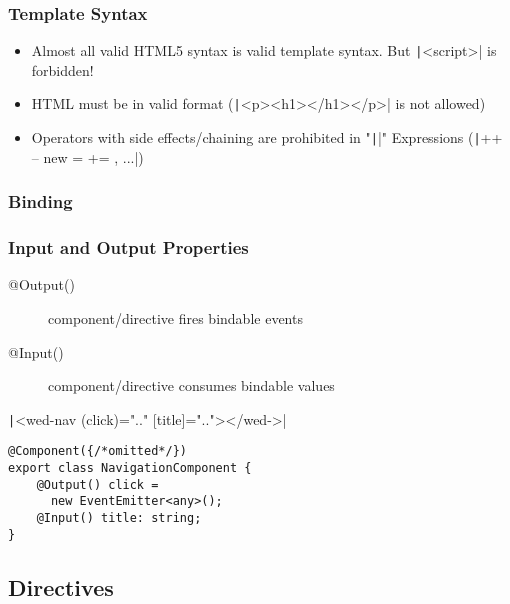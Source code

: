 \begin{multicols*}{4}
\subsubsection{Template Syntax}
\begin{itemize}
    \item Almost all valid HTML5 syntax is valid template syntax. But \texttt|<script>| is forbidden!
    \item HTML must be in valid format (\texttt|<p><h1></h1></p>| is not allowed)
    \item Operators with side effects/chaining are prohibited in "\texttt|{{}}|" Expressions (\texttt|++ -- new = += , ...|)
\end{itemize}

\subsubsection{Binding}

\subsubsection{Input and Output Properties}
\begin{description}
    \item[@Output()] component/directive fires bindable events
    \item[@Input()] component/directive consumes bindable values
\end{description}
\texttt|<wed-nav (click)=".." [title]=".."></wed->|
\begin{verbatim}
@Component({/*omitted*/})
export class NavigationComponent {
    @Output() click =
      new EventEmitter<any>();
    @Input() title: string;
}
\end{verbatim}

\subsection{Directives}

\end{multicols*}
